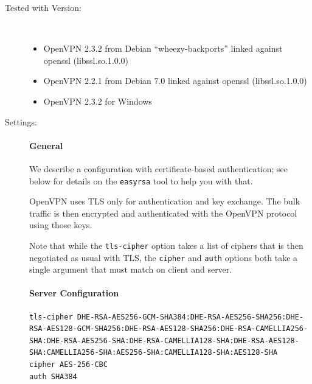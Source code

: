 \begin{description}

\item[Tested with Version:] \mbox{}\\

\begin{itemize}
\item OpenVPN 2.3.2 from Debian ``wheezy-backports'' linked against openssl (libssl.so.1.0.0) 
\item OpenVPN 2.2.1 from Debian 7.0 linked against openssl
    (libssl.so.1.0.0) 
\item OpenVPN 2.3.2 for Windows
\end{itemize}

\item[Settings:] \mbox{}

\paragraph{General}\mbox{}

We describe a configuration with certificate-based authentication; see
below for details on the \verb|easyrsa| tool to help you with that.

OpenVPN uses TLS only for authentication and key exchange. The
bulk traffic is then encrypted and authenticated with the OpenVPN
protocol using those keys.

Note that while the \verb|tls-cipher| option takes a list of ciphers
that is then negotiated as usual with TLS, the \verb|cipher|
and \verb|auth| options both take a single argument that must match on
client and server.

\paragraph{Server Configuration}\mbox{}


\begin{lstlisting}[breaklines]
tls-cipher DHE-RSA-AES256-GCM-SHA384:DHE-RSA-AES256-SHA256:DHE-RSA-AES128-GCM-SHA256:DHE-RSA-AES128-SHA256:DHE-RSA-CAMELLIA256-SHA:DHE-RSA-AES256-SHA:DHE-RSA-CAMELLIA128-SHA:DHE-RSA-AES128-SHA:CAMELLIA256-SHA:AES256-SHA:CAMELLIA128-SHA:AES128-SHA
cipher AES-256-CBC
auth SHA384
\end{lstlisting}


\end{description}
